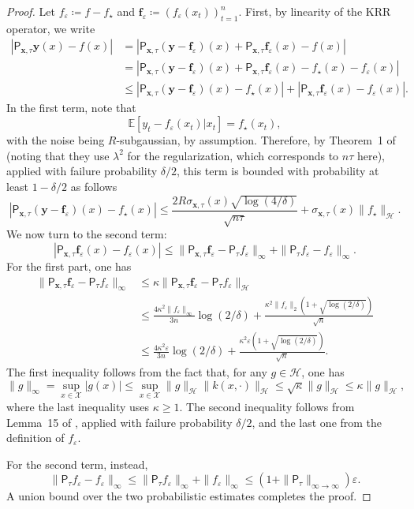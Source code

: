 \documentclass{article}
\let\cite\citep
\numberwithin{theorem}{section}
\theoremstyle{definition}
\newcommand{\fwithin}{f_\star}
\newcommand{\Hs}{\mathcal H}
\newcommand{\Xs}{\mathcal X}
\begin{document}
\fundleb*
\begin{proof}
    Let $f_\varepsilon\coloneqq f-\fwithin$ and $\bm f_\varepsilon\coloneqq (f_\varepsilon(x_t))_{t=1}^n$.
    First, by linearity of the KRR operator, we write
    \begin{align*}
        |\mathsf{P}_{\bm x,\tau}\bm y(x)-f(x)| &= |\mathsf{P}_{\bm x,\tau}(\bm y-\bm f_\varepsilon)(x)+\mathsf{P}_{\bm x,\tau}\bm f_\varepsilon(x)-f(x)|\\
        &= |\mathsf{P}_{\bm x,\tau}(\bm y-\bm f_\varepsilon)(x)+\mathsf{P}_{\bm x,\tau}\bm f_\varepsilon(x)-\fwithin(x)-f_\varepsilon(x)|\\
        &\le |\mathsf{P}_{\bm x,\tau}(\bm y-\bm f_\varepsilon)(x)-\fwithin(x)|+|\mathsf{P}_{\bm x,\tau}\bm f_\varepsilon(x)-f_\varepsilon(x)|.
    \end{align*}
    In the first term, note that
    $$\mathbb E[y_t-f_\varepsilon(x_t)|x_t]=\fwithin(x_t),$$
    with the noise being $R$-subgaussian, by assumption.
    Therefore, by Theorem~1 of \cite{vakili2021optimal} (noting that they use $\lambda^2$ for the regularization, which corresponds to $n\tau$ here), applied with failure probability $\delta/2$, this term is bounded with probability at least $1-\delta/2$ as follows
    $$|\mathsf{P}_{\bm x,\tau}(\bm y-\bm f_\varepsilon)(x)-\fwithin(x)|\le \frac{2R\sigma_{\bm x,\tau}(x)\sqrt{\log(4/\delta)}}{\sqrt {n\tau}}+ \sigma_{\bm x,\tau}(x)\|\fwithin\|_{\Hs}.$$
    We now turn to the second term:
    $$|\mathsf{P}_{\bm x,\tau}\bm f_\varepsilon(x)-f_\varepsilon(x)|\le \|\mathsf{P}_{\bm x,\tau}\bm f_\varepsilon-\mathsf{P}_{\tau}f_\varepsilon\|_\infty+\|\mathsf{P}_{\tau}f_\varepsilon-f_\varepsilon\|_\infty.$$
    For the first part, one has
    \begin{align*}\|\mathsf{P}_{\bm x,\tau}\bm f_\varepsilon-\mathsf{P}_{\tau}f_\varepsilon\|_\infty
        &\le \kappa \|\mathsf{P}_{\bm x,\tau}\bm f_\varepsilon-\mathsf{P}_{\tau}f_\varepsilon\|_\Hs\\
        &\le \frac{4\kappa^2 \|f_\varepsilon\|_\infty}{3n}\log(2/\delta)+\frac{\kappa^2 \|f_\varepsilon\|_2(1+\sqrt{\log(2/\delta)})}{\sqrt n}\\
        &\le \frac{4\kappa^2 \varepsilon}{3n}\log(2/\delta)+\frac{\kappa^2 \varepsilon(1+\sqrt{\log(2/\delta)})}{\sqrt n}.
    \end{align*}
    The first inequality follows from the fact that, for any $g\in \Hs$, one has
    $$\|g\|_\infty=\sup_{x\in \Xs}|g(x)|\le \sup_{x\in \Xs}\|g\|_\Hs \|k(x,\cdot)\|_\Hs \le \sqrt{\kappa}\|g\|_\Hs\le \kappa \|g\|_\Hs,$$
    where the last inequality uses $\kappa\ge 1$.
    The second inequality follows from Lemma~15 of \cite{liu2023estimation}, applied with failure probability $\delta/2$, and the last one from the definition of $f_\varepsilon$.

    For the second term, instead,
    $$\|\mathsf{P}_{\tau}f_\varepsilon-f_\varepsilon\|_\infty\le \|\mathsf{P}_{\tau}f_\varepsilon\|_\infty+\|f_\varepsilon\|_\infty\le (1+\|\mathsf{P}_{\tau}\|_{\infty\to \infty})\varepsilon.$$
    A union bound over the two probabilistic estimates completes the proof.
\end{proof}
\end{document}
